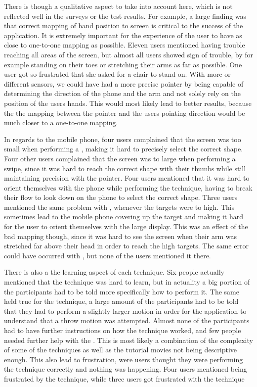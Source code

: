 There is though a qualitative aspect to take into account here, which is not reflected well in the surveys or the test results. For example, a large finding was that correct mapping of hand position to screen is critical to the success of the application.
It is extremely important for the experience of the user to have as close to one-to-one mapping as possible. 
Eleven users mentioned having trouble reaching all areas of the screen, but almost all users showed sign of trouble, by for example standing on their toes or stretching their arms as far as possible.
One user got so frustrated that she asked for a chair to stand on. 
With more or different sensors, we could have had a more precise pointer by being capable of determining the direction of the phone and the arm and not solely rely on the position of the users hands.
This would most likely lead to better results, because the the mapping between the pointer and the users pointing direction would be much closer to a one-to-one mapping.

In regards to the mobile phone, four users complained that the screen was too small when performing a \pinch, making it hard to precisely select the correct shape.
Four other users complained that the screen was to large when performing a swipe, since it was hard to reach the correct shape with their thumbs while still maintaining precision with the pointer. 
Four users mentioned that it was hard to orient themselves with the phone while performing the \throw technique, having to break their flow to look down on the phone to select the correct shape. 
Three users mentioned the same problem with \swipe, whenever the targets were to high.
This sometimes lead to the mobile phone covering up the target and making it hard for the user to orient themselves with the large display. 
This was an effect of the bad mapping though, since it was hard to see the screen when their arm was stretched far above their head in order to reach the high targets.
The same error could have occurred with \tilt, but none of the users mentioned it there.  

There is also a the learning aspect of each technique. Six people actually mentioned that the \pinch technique was hard to learn, but in actuality a big portion of the participants had to be told more specifically how to perform it. 
The same held true for the \throw technique, a large amount of the participants had to be told that they had to perform a slightly larger motion in order for the application to understand that a throw motion was attempted.
Almost none of the participants had to have further instructions on how the \swipe technique worked, and few people needed further help with the \tilt. 
This is most likely a combination of the complexity of some of the techniques as well as the tutorial movies not being descriptive enough. 
This also lead to frustration, were users thought they were performing the technique correctly and nothing was happening. 
Four users mentioned being frustrated by the \pinch technique, while three users got frustrated with the \tilt technique

